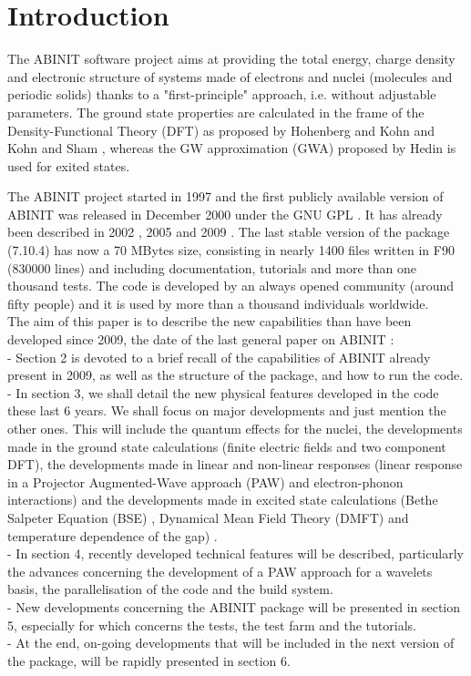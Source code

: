 \documentclass{elsart}
\begin{document}
\newpage

\section{Introduction}


The ABINIT software project aims at providing the total energy, charge density and electronic structure of systems made of electrons and nuclei (molecules and periodic solids) thanks to a "first-principle" approach, i.e. without adjustable parameters. The ground state properties are calculated in the frame of the Density-Functional Theory (DFT) as proposed by Hohenberg and Kohn \cite{Hohenberg64} and Kohn and Sham \cite{Kohn65}, whereas the GW approximation (GWA) proposed by Hedin \cite{Hedin65} is used for exited states.


The ABINIT project started in 1997 and the first publicly available version of ABINIT was released in December 2000 under the GNU GPL \cite{GNU}. It has already been described in 2002 \cite{Gonze02}, 2005  \cite{Gonze05} and 2009 \cite{Gonze09}. The last stable version of the package (7.10.4) has now a 70 MBytes size, consisting in nearly 1400 files written in F90 (830000 lines) and including documentation, tutorials and more than one thousand tests. The code is developed by an always opened community (around fifty people) and it is used by more than a thousand individuals worldwide. \\

The aim of this paper is to describe the new capabilities than have been developed since 2009, the date of the last general paper on ABINIT \cite{Gonze09}:\\
- Section 2 is devoted to a brief recall of the capabilities of ABINIT already present in 2009, as well as the structure of the package, and how to run the code. \\
- In section 3, we shall detail the new physical features developed in the code these last 6 years. We shall focus on major developments and just mention the other ones. This will include the quantum effects for the nuclei, the developments made in the ground state calculations (finite electric fields and two component DFT), the developments made in linear and non-linear responses (linear response in a Projector Augmented-Wave approach (PAW) and electron-phonon interactions) and the developments made in excited state calculations (Bethe Salpeter Equation (BSE) , Dynamical Mean Field Theory (DMFT) and temperature dependence of the gap) .\\
- In section 4, recently developed technical features will be described, particularly the advances concerning the development of a PAW approach for a wavelets basis, the parallelisation of the code and the build system.\\
- New developments concerning the ABINIT package will be presented in section 5, especially for which concerns the tests, the test farm and the tutorials.\\
- At the end, on-going developments that will be included in the next version of the package, will be rapidly presented in section 6.\\
\end{document}
